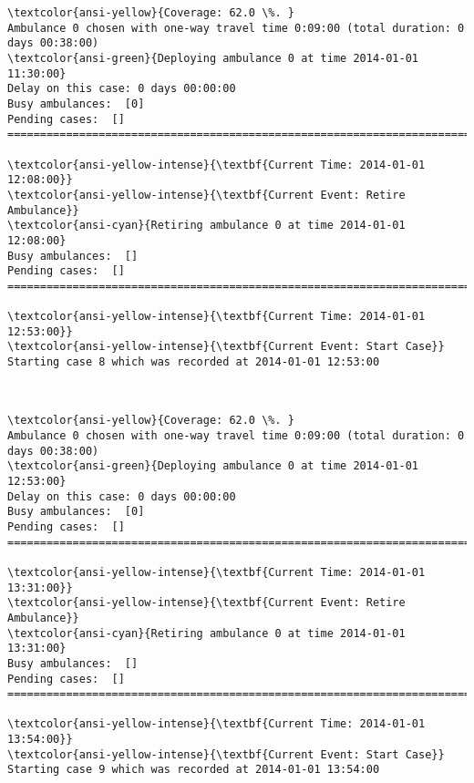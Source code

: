 \documentclass[11pt]{article}
\begin{document}
    \begin{Verbatim}[commandchars=\\\{\}]
\textcolor{ansi-yellow}{Coverage: 62.0 \%. }
Ambulance 0 chosen with one-way travel time 0:09:00 (total duration: 0 days 00:38:00)
\textcolor{ansi-green}{Deploying ambulance 0 at time 2014-01-01 11:30:00}
Delay on this case: 0 days 00:00:00
Busy ambulances:  [0]
Pending cases:  []
========================================================================

\textcolor{ansi-yellow-intense}{\textbf{Current Time: 2014-01-01 12:08:00}}
\textcolor{ansi-yellow-intense}{\textbf{Current Event: Retire Ambulance}}
\textcolor{ansi-cyan}{Retiring ambulance 0 at time 2014-01-01 12:08:00}
Busy ambulances:  []
Pending cases:  []
========================================================================

\textcolor{ansi-yellow-intense}{\textbf{Current Time: 2014-01-01 12:53:00}}
\textcolor{ansi-yellow-intense}{\textbf{Current Event: Start Case}}
Starting case 8 which was recorded at 2014-01-01 12:53:00

    \end{Verbatim}

    \begin{center}
    \end{center}
    { \hspace*{\fill} \\}
    
    \begin{Verbatim}[commandchars=\\\{\}]
\textcolor{ansi-yellow}{Coverage: 62.0 \%. }
Ambulance 0 chosen with one-way travel time 0:09:00 (total duration: 0 days 00:38:00)
\textcolor{ansi-green}{Deploying ambulance 0 at time 2014-01-01 12:53:00}
Delay on this case: 0 days 00:00:00
Busy ambulances:  [0]
Pending cases:  []
========================================================================

\textcolor{ansi-yellow-intense}{\textbf{Current Time: 2014-01-01 13:31:00}}
\textcolor{ansi-yellow-intense}{\textbf{Current Event: Retire Ambulance}}
\textcolor{ansi-cyan}{Retiring ambulance 0 at time 2014-01-01 13:31:00}
Busy ambulances:  []
Pending cases:  []
========================================================================

\textcolor{ansi-yellow-intense}{\textbf{Current Time: 2014-01-01 13:54:00}}
\textcolor{ansi-yellow-intense}{\textbf{Current Event: Start Case}}
Starting case 9 which was recorded at 2014-01-01 13:54:00

    \end{Verbatim}
\end{document}

